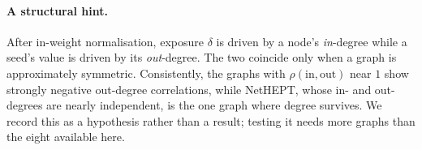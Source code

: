 \paragraph{A structural hint.}
After in-weight normalisation, exposure $\delta$ is driven by a node's \emph{in}-degree while a
seed's value is driven by its \emph{out}-degree. The two coincide only when a graph is
approximately symmetric. Consistently, the graphs with $\rho(\text{in}, \text{out})$ near $1$ show
strongly negative out-degree correlations, while NetHEPT, whose in- and out-degrees are nearly
independent, is the one graph where degree survives. We record this as a hypothesis rather than a
result; testing it needs more graphs than the eight available here.
